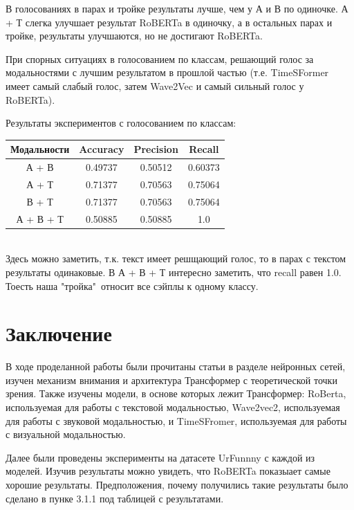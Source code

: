 \documentclass[PMI,VKR]{HSEUniversity}
\begin{document}
В голосованиях в парах и тройке результаты лучше, чем у А и В по одиночке.
А + Т слегка улучшает результат RoBERTa в одиночку, а в остальных парах и тройке, результаты улучшаются, но не достигают RoBERTa.


При спорных ситуациях в голосованием по классам, решающий голос за модальностями с лучшим результатом в прошлой частью (т.е. TimeSFormer имеет самый слабый голос, затем Wave2Vec и самый сильный голос у RoBERTa).

Результаты экспериментов с голосованием по классам: \\

\begin{center}
    \begin{tabular}{ |c||c|c|c|}
        \hline
        Модальности & Accuracy & Precision & Recall  \\
        \hline
        А + В       & 0.49737  & 0.50512   & 0.60373 \\
        А + Т       & 0.71377  & 0.70563   & 0.75064 \\
        В + Т       & 0.71377  & 0.70563   & 0.75064 \\
        А + В + Т   & 0.50885  & 0.50885   & 1.0     \\
        \hline
    \end{tabular}
\end{center} \\

Здесь можно заметить, т.к. текст имеет решщающий голос, то в парах с текстом результаты одинаковые.
В А + В + Т интересно заметить, что recall равен 1.0. Тоесть наша "тройка"\ относит все сэйплы к одному классу.


\chapter{Заключение}

В ходе проделанной работы были прочитаны статьи в разделе нейронных сетей, изучен механизм внимания и архитектура Трансформер с теоретической точки зрения. Также изучены модели, в основе которых лежит Трансформер: RoBerta, используемая для работы с текстовой модальностью, Wave2vec2, используемая для работы с звуковой модальностью, и TimeSFromer, используемая для работы с визуальной модальностью.

Далее были проведены эксперименты  на датасете UrFunnny с каждой из моделей. Изучив результаты можно увидеть, что RoBERTa показыает самые хорошие результаты. Предположения, почему получились такие результаты было сделано в пунке 3.1.1 под таблицей с результатами.
\end{document}
